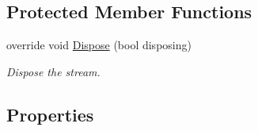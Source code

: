 \subsection*{Protected Member Functions}
\begin{DoxyCompactItemize}
\item 
override void \mbox{\hyperlink{class_super_tiled2_unity_1_1_ionic_1_1_zlib_1_1_g_zip_stream_a43554a520237d8aedb81068572f93507}{Dispose}} (bool disposing)
\begin{DoxyCompactList}\small\item\em Dispose the stream. \end{DoxyCompactList}\end{DoxyCompactItemize}
\subsection*{Properties}
